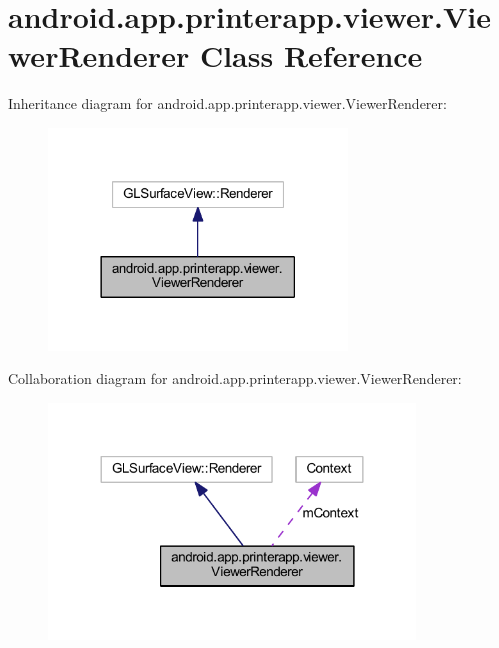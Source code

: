 \hypertarget{classandroid_1_1app_1_1printerapp_1_1viewer_1_1_viewer_renderer}{}\section{android.\+app.\+printerapp.\+viewer.\+Viewer\+Renderer Class Reference}
\label{classandroid_1_1app_1_1printerapp_1_1viewer_1_1_viewer_renderer}


Inheritance diagram for android.\+app.\+printerapp.\+viewer.\+Viewer\+Renderer\+:
\nopagebreak
\begin{figure}[H]
\begin{center}
\leavevmode
\includegraphics[width=225pt]{classandroid_1_1app_1_1printerapp_1_1viewer_1_1_viewer_renderer__inherit__graph}
\end{center}
\end{figure}


Collaboration diagram for android.\+app.\+printerapp.\+viewer.\+Viewer\+Renderer\+:
\nopagebreak
\begin{figure}[H]
\begin{center}
\leavevmode
\includegraphics[width=276pt]{classandroid_1_1app_1_1printerapp_1_1viewer_1_1_viewer_renderer__coll__graph}
\end{center}
\end{figure}
